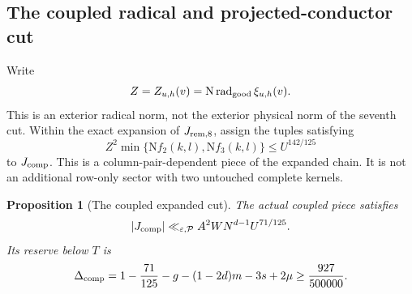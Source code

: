 \documentclass[11pt]{article}
\newtheorem{proposition}[theorem]{Proposition}
\theoremstyle{definition}
\newcommand{\N}{\mathrm N}
\newcommand{\eps}{\varepsilon}
\newcommand{\lls}{\ll_{\eps,\mathcal P}}
\begin{document}
\subsection{The coupled radical and projected-conductor cut}
\label{late-subsec-coupled}

Write
\[
 Z=Z_{u,h}(v)=\N\operatorname{rad}_{\rm good}\xi_{u,h}(v).
\]
This is an exterior radical norm, not the exterior physical norm of
the seventh cut.  Within the exact expansion of $J_{\rm rem,8}$,
assign the tuples satisfying
\begin{equation}
 Z^2\min\{\N f_2(k,l),\N f_3(k,l)\}
                          \le U^{142/125}
 \label{late-eq-coupled-cut}
\end{equation}
to $J_{\rm comp}$.  This is a column-pair-dependent piece of the
expanded chain.  It is not an additional row-only sector with two
untouched complete kernels.

\begin{proposition}[The coupled expanded cut]
\label{late-prop-coupled}
The actual coupled piece satisfies
\begin{equation}
 |J_{\rm comp}|\lls A^2W N^{d-1}U^{71/125}.
 \label{late-eq-coupled-bound}
\end{equation}
Its reserve below $T$ is
\begin{equation}
 \Delta_{\rm comp}
  =1-\frac{71}{125}-g-(1-2d)m-3s+2\mu
                      \ge\frac{927}{500000}.
 \label{late-eq-coupled-reserve}
\end{equation}
\end{proposition}
\end{document}
